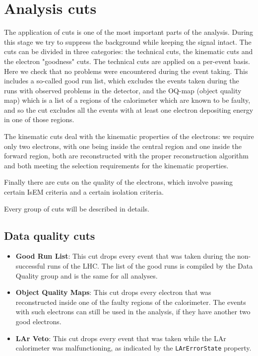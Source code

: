 \section{Analysis cuts}
\label{sec:Sel_cuts}

The application of cuts is one of the most important parts of the analysis. During this stage we try to suppress the background while keeping the signal intact. The cuts can be divided in three categories: the technical cuts, the kinematic cuts and the electron "goodness" cuts. The technical cuts are applied on a per-event basis. Here we check that no problems were encountered during the event taking. This includes a so-called good run list, which excludes the events taken during the runs with observed problems in the detector, and the OQ-map (object quality map) which is a list of a regions of the calorimeter which are known to be faulty, and so the cut excludes all the events with at least one electron depositing energy in one of those regions.

The kinematic cuts deal with the kinematic properties of the electrons: we require only two electrons, with one being inside the central region and one inside the forward region, both are reconstructed with the proper reconstruction algorithm and both meeting the selection requirements for the kinematic properties.

Finally there are cuts on the quality of the electrons, which involve passing certain IsEM criteria and a certain isolation criteria.

Every group of cuts will be described in details.

\subsection{Data quality cuts}
\label{sec:Sel_GRL_OQ}

\begin{itemize}
\item {\bfseries Good Run List}: This cut drops every event that was taken during the non-successful runs of the LHC. The list of the good runs is compiled by the Data Quality group and is the same for all analyses.
\item {\bfseries Object Quality Maps}: This cut drops every electron that was reconstructed inside one of the faulty regions of the calorimeter. The events with such electrons can still be used in the analysis, if they have another two good electrons.
\item {\bfseries LAr Veto}: This cut drops every event that was taken while the LAr calorimeter was malfunctioning, as indicated by the \texttt{LArErrorState} property.
\end{itemize}


